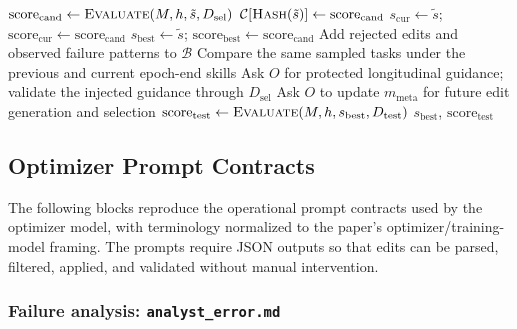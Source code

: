 \documentclass[
]{article}
\begin{document}
\begin{algorithm}[t]
\begin{algorithmic}[1]
        \Else
            \State $\mathrm{score}_\mathrm{cand} \gets \Call{Evaluate}{M,h,\tilde{s},D_\mathrm{sel}}$
            \State $\mathcal{C}[\Call{Hash}{\tilde{s}}] \gets \mathrm{score}_\mathrm{cand}$
        \EndIf
            \State $s_\mathrm{cur} \gets \tilde{s}$; $\mathrm{score}_\mathrm{cur} \gets \mathrm{score}_\mathrm{cand}$
                \State $s_\mathrm{best} \gets \tilde{s}$; $\mathrm{score}_\mathrm{best} \gets \mathrm{score}_\mathrm{cand}$
            \EndIf
        \Else
            \State Add rejected edits and observed failure patterns to $\mathcal{B}$
        \EndIf
    \EndFor
        \State Compare the same sampled tasks under the previous and current epoch-end skills
        \State Ask $O$ for protected longitudinal guidance; validate the injected guidance through $D_\mathrm{sel}$
    \EndIf
        \State Ask $O$ to update $m_\mathrm{meta}$ for future edit generation and selection
    \EndIf
\EndFor
\State $\mathrm{score}_\mathrm{test} \gets \Call{Evaluate}{M,h,s_\mathrm{best},D_\mathrm{test}}$
\State \Return $s_\mathrm{best}$, $\mathrm{score}_\mathrm{test}$
\end{algorithmic}
\end{algorithm}

\subsection{Optimizer Prompt Contracts}\label{sec-app-prompt-contracts}

The following blocks reproduce the operational prompt contracts used by
the optimizer model, with terminology normalized to the paper's
optimizer/training-model framing. The prompts require JSON outputs so
that edits can be parsed, filtered, applied, and validated without
manual intervention.

\subsubsection{\texorpdfstring{Failure analysis:
\texttt{analyst\_error.md}}{Failure analysis: analyst\_error.md}}\label{failure-analysis-analyst_error.md}
\end{document}
